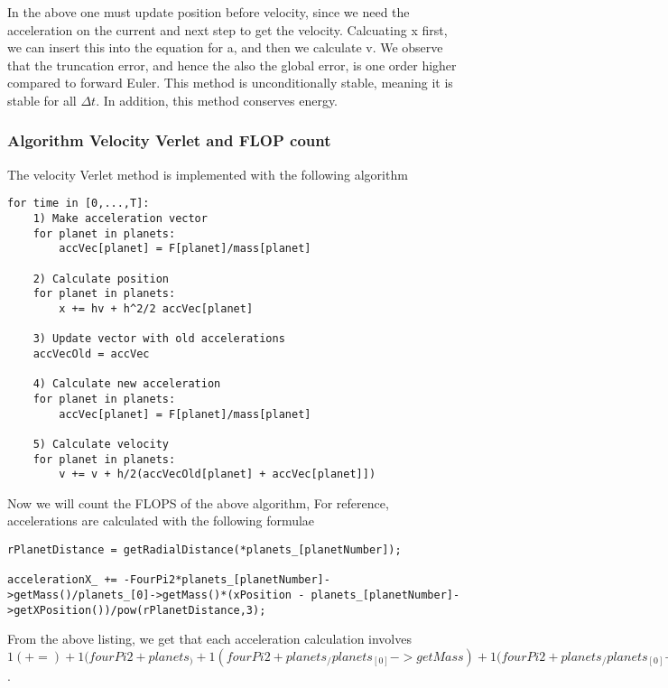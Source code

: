\documentclass{article}
\begin{document}
In the above one must update position before velocity, since we need the acceleration on the current and next step to get the velocity. Calcuating x first, we can insert this into the equation for a, and then we calculate v. We observe that the truncation error, and hence the also the global error, is one order higher compared to forward Euler. This method is unconditionally stable, meaning it is stable for all $\Delta t$. In addition, this method conserves energy.

\subsubsection{Algorithm Velocity Verlet and FLOP count}

The velocity Verlet method is implemented with the following algorithm

\begin{lstlisting}
for time in [0,...,T]:
	1) Make acceleration vector
	for planet in planets: 
		accVec[planet] = F[planet]/mass[planet]
					
	2) Calculate position
	for planet in planets: 
		x += hv + h^2/2 accVec[planet]
		
	3) Update vector with old accelerations
	accVecOld = accVec
	
	4) Calculate new acceleration
	for planet in planets: 
		accVec[planet] = F[planet]/mass[planet]
		
	5) Calculate velocity
	for planet in planets:
		v += v + h/2(accVecOld[planet] + accVec[planet]])			
\end{lstlisting}

Now we will count the FLOPS of the above algorithm, For reference, accelerations are calculated with the following formulae

\begin{lstlisting}
rPlanetDistance = getRadialDistance(*planets_[planetNumber]); 

accelerationX_ += -FourPi2*planets_[planetNumber]->getMass()/planets_[0]->getMass()*(xPosition - planets_[planetNumber]->getXPosition())/pow(rPlanetDistance,3);
\end{lstlisting}

From the above listing, we get that each acceleration calculation involves $1(+=) + 1(fourPi2+planets_) + 1(fourPi2+planets_/planets_[0]->getMass) + 1(fourPi2+planets_/planets_[0]->getMass*(xPosition - planets_)) + 1(xPosition - planets_)+ 3(.../r^3) = 8\; FLOPS$.\\
\end{document}
